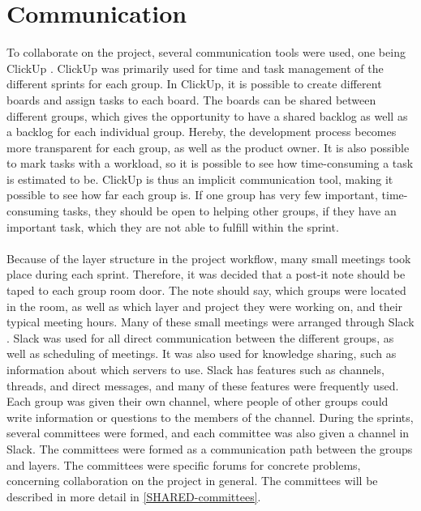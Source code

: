 \section{Communication}\label{communication_in_knox}


To collaborate on the project, several communication tools were used, one being ClickUp \cite{clickup}. ClickUp was primarily used for time and task management of the different sprints for each group. In ClickUp, it is possible to create different boards and assign tasks to each board. The boards can be shared between different groups, which gives the opportunity to have a shared backlog as well as a backlog for each individual group. Hereby, the development process becomes more transparent for each group, as well as the product owner. It is also possible to mark tasks with a workload, so it is possible to see how time-consuming a task is estimated to be. ClickUp is thus an implicit communication tool, making it possible to see how far each group is. If one group has very few important, time-consuming tasks, they should be open to helping other groups, if they have an important task, which they are not able to fulfill within the sprint.
\\\\
Because of the layer structure in the project workflow, many small meetings took place during each sprint. Therefore, it was decided that a post-it note should be taped to each group room door. The note should say, which groups were located in the room, as well as which layer and project they were working on, and their typical meeting hours. 
Many of these small meetings were arranged through Slack \cite{slack}. Slack was used for all direct communication between the different groups, as well as scheduling of meetings. It was also used for knowledge sharing, such as information about which servers to use. Slack has features such as channels, threads, and direct messages, and many of these features were frequently used. Each group was given their own channel, where people of other groups could write information or questions to the members of the channel. During the sprints, several committees were formed, and each committee was also given a channel in Slack. The committees were formed as a communication path between the groups and layers. The committees were specific forums for concrete problems, concerning collaboration on the project in general. The committees will be described in more detail in \ref{SHARED-committees}.
